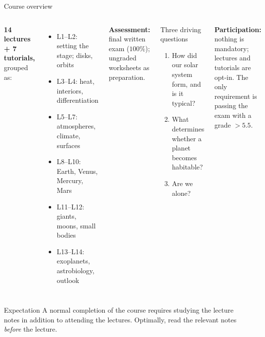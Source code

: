 \documentclass[aspectratio=169, 11pt]{beamer}
\begin{document}
\begin{frame}{Course overview}
  \footnotesize
  \begin{columns}[T]
    \textbf{14 lectures + 7 tutorials,} grouped as:
    \begin{itemize}
      \item L1--L2: setting the stage; disks, orbits
      \item L3--L4: heat, interiors, differentiation
      \item L5--L7: atmospheres, climate, surfaces
      \item L8--L10: Earth, Venus, Mercury, Mars
      \item L11--L12: giants, moons, small bodies
      \item L13--L14: exoplanets, astrobiology, outlook
    \end{itemize}
    \vskip4pt\relax
    \textbf{Assessment:} final written exam ($100\%$); ungraded worksheets as preparation.

    \begin{block}{Three driving questions}
      \begin{enumerate}
        \item How did our solar system form, and is it typical?
        \item What determines whether a planet becomes habitable?
        \item Are we alone?
      \end{enumerate}
    \end{block}
    \vskip6pt\relax
    \textbf{Participation:} nothing is mandatory; lectures and tutorials are opt-in. The only requirement is passing the exam with a grade $> 5.5$.
  \end{columns}
  \vskip4pt\relax
  \begin{block}{Expectation}
    A normal completion of the course requires studying the lecture notes in addition to attending the lectures. Optimally, read the relevant notes \emph{before} the lecture.
  \end{block}
\end{frame}
\end{document}
